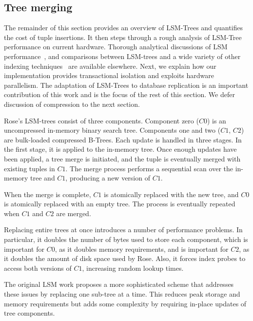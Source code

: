 \documentclass{vldb}
\newcommand{\rows}{Rose\xspace}
\newcommand{\rowss}{Rose's\xspace}
\begin{document}

\subsection{Tree merging}

The remainder of this section provides an overview of LSM-Trees and quantifies the
cost of tuple insertions.  It then steps through a rough analysis of
LSM-Tree performance on current hardware.  Thorough analytical discussions of LSM
performance~\cite{lsm}, and comparisons between LSM-trees and a wide variety of other indexing techniques~\cite{partexp} are available elsewhere.  Next,
we explain how our implementation provides transactional isolation and
exploits hardware parallelism.  The adaptation of LSM-Trees to
database replication is an important contribution of this work and is
the focus of the rest of this section.  We defer discussion of
compression to the next section.

\rowss LSM-trees consist of three components.  Component zero ($C0$)
is an uncompressed in-memory binary search tree.  Components one and two ($C1$,
$C2$) are bulk-loaded compressed B-Trees.
Each update is handled in three stages.  In the first stage,
it is applied to the in-memory tree.  Once enough updates
have been applied, a tree merge is initiated, and the tuple is
eventually merged with existing tuples in $C1$.  The merge process
performs a sequential scan over the in-memory tree and $C1$, producing
a new version of $C1$.

When the merge is complete, $C1$ is atomically replaced
with the new tree, and $C0$ is atomically replaced with an empty tree.
The process is eventually repeated when $C1$ and $C2$ are merged.

Replacing entire trees at once
introduces a number of performance problems.  In particular, it
doubles the number of bytes used to store each component, which is
important for $C0$, as it doubles memory requirements, and is
important for $C2$, as it doubles the amount of disk space used by
\rows.  Also, it forces index probes to access both versions of $C1$,
increasing random lookup times.

The original LSM work proposes a more sophisticated scheme that
addresses these issues by replacing one sub-tree at a time.  This
reduces peak storage and memory requirements but adds some complexity
by requiring in-place updates of tree components.
\end{document}
